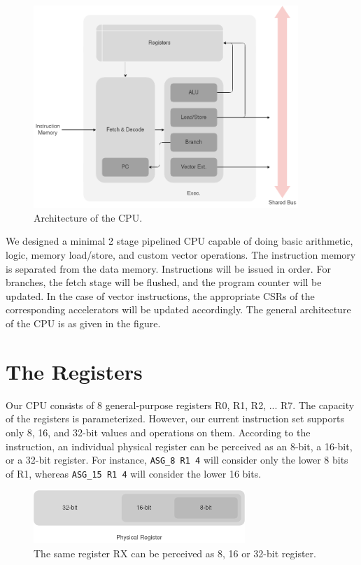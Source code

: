 \begin{paper}
\renewcommand*{\pagemark}{}

\section*{}


\begin{figure}[H]
\centering
\includegraphics[width=10cm]{Images/Overview-CPU(1).png}
\caption{\content Architecture of the CPU.}
\end{figure}

\nointend We designed a minimal 2 stage pipelined CPU capable of doing basic arithmetic, logic, memory load/store, and custom vector operations. The instruction memory is separated from the data memory. Instructions will be issued in order. For branches, the fetch stage will be flushed, and the program counter will be updated. In the case of vector instructions, the appropriate CSRs of the corresponding accelerators will be updated accordingly. The general architecture of the CPU is as given in the figure.
\section*{The Registers\sdot}
Our CPU consists of 8 general-purpose registers R0, R1, R2, ... R7. The capacity of the registers is parameterized. However, our current instruction set supports only 8, 16, and 32-bit values and operations on them. According to the instruction, an individual physical register can be perceived as an 8-bit, a 16-bit, or a 32-bit register. For instance, \texttt{ASG\_8 R1 4} will consider only the lower 8 bits of R1, whereas \texttt{ASG\_15 R1 4} will consider the lower 16 bits.
\begin{figure}[H]
\centering
\includegraphics[width=8cm]{Images/Overview-Registers.png}
\caption{\content The same register RX can be perceived as 8, 16 or 32-bit register.}
\end{figure}


\end{paper}
